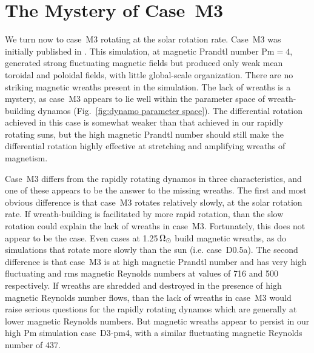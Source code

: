 \section{The Mystery of Case~M3}
We turn now to case~M3 rotating at the solar rotation rate.  
Case~M3 was initially published in \cite{Brun_et_al_2004}.  This
simulation, at magnetic Prandtl number $\mathrm{Pm}=4$, generated
strong fluctuating magnetic fields but produced only weak mean
toroidal and poloidal fields, with little global-scale organization.
There are no striking magnetic wreaths present in the simulation.
The lack of wreaths is a mystery, as case~M3 appears to lie well
within the parameter space of wreath-building dynamos
(Fig.~\ref{fig:dynamo parameter space}).  The differential rotation achieved
in this case is somewhat weaker than that achieved in our rapidly
rotating suns, but the high magnetic Prandtl number should still make
the differential rotation highly effective at stretching and
amplifying wreaths of magnetism.

Case~M3 differs from the rapidly rotating dynamos in three
characteristics, and one of these appears to be the answer to the
missing wreaths.   
The first and most obvious difference is that case~M3 rotates
relatively slowly, at the solar rotation 
rate.  If wreath-building is facilitated by more rapid rotation, than
the slow rotation could explain the lack of wreaths in case~M3.
Fortunately, this does not appear to be the case.  Even cases at
1.25$\thinspace\Omega_\odot$ build magnetic wreaths, as do simulations
that rotate more slowly than the sun (i.e. case~D0.5a).  The second
difference is that case~M3 is at high
magnetic Prandtl number and has very high fluctuating and rms magnetic
Reynolds numbers at values of 716 and 500 respectively.  If wreaths
are shredded and destroyed in the presence of high magnetic Reynolds
number flows, than the lack of wreaths in case~M3 would raise serious
questions for the rapidly rotating dynamos which are generally at
lower magnetic Reynolds numbers.  But magnetic wreaths appear to
persist in our high $\mathrm{Pm}$ simulation case~D3-pm4, with a similar
fluctuating magnetic Reynolds number of 437.  


